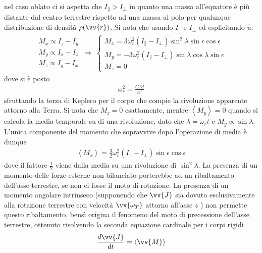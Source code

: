 \documentclass[a4paper, oneside]{book}
\begin{document}
nel caso oblato ci si aspetta che $I_\parallel > I_\perp$ in quanto una massa all'equatore è più distante 
dal centro terrestre rispetto ad una massa al polo per qualunque 
distribuzione di densità $\rho(\vv{r} )$. Si nota che usando $I_\parallel$ e $I_\perp$ ed esplicitando $\hat{u}$:
\begin{gather*}
    \begin{array}{l}
        \displaystyle M_x \propto I_z - I_y \\
        \displaystyle M_y \propto I_x - I_z \\
        \displaystyle M_z \propto I_y - I_x
    \end{array} 
    \ \Longrightarrow \ 
    \left\{\begin{array}{l}
        \displaystyle M_x = 3\omega^{2}_r(I_\parallel - I_\perp) \sin^{2}\lambda \sin\epsilon \cos\epsilon \\
        \displaystyle M_y = -3\omega^{2}_r(I_\parallel - I_\perp) \sin\lambda \cos\lambda \sin\epsilon \\
        \displaystyle M_z = 0
    \end{array}\right.
\end{gather*} 
dove si è posto 
\begin{gather*}
    \omega^{2}_r = \frac{GM}{a^{3}}
\end{gather*}
sfruttando la terza di Keplero per il corpo che compie la rivoluzione apparente 
attorno alla Terra. Si nota che $M_z = 0$ esattamente, mentre $\left< M_y \right> = 0$ quando 
si calcola la media temporale su di una rivoluzione, dato che $\lambda = \omega_r t$ e
$M_y \propto \sin\lambda$. L'unica componente del momento che sopravvive dopo l'operazione 
di media è dunque 
\begin{align}
    \boxed{\left< M_x \right> = \frac{3}{2} \omega_r^{2}(I_\parallel - I_\perp)\sin\epsilon \cos\epsilon}
\end{align} 
dove il fattore $\frac{1}{2}$ viene dalla media su una rivoluzione di $\sin^{2}\lambda$. 
La presenza di un momento delle forze esterne non bilanciato porterebbe ad un
ribaltamento dell'asse terrestre, se non ci fosse il moto di rotazione. La presenza di un 
momento angolare intrinseco (supponendo che $\vv{J}$ sia dovuto esclusivamente alla rotazione terrestre con 
velocità $\vv{\omega_T}$ attorno all'asse $z$  )
non permette questo ribaltamento, bensì origina
il fenomeno del moto di precessione dell'asse terrestre, ottenuto 
risolvendo la seconda equazione cardinale per i corpi rigidi 
\begin{gather*}
    \frac{d\vv{J} }{dt} = \left< \vv{M}  \right> 
\end{gather*}
\end{document}
